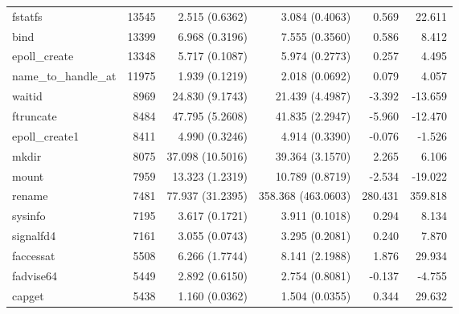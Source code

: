 \begin{longtable}{>{\ttfamily}lrrrrr}
                        fstatfs &      13545 &           2.515 (0.6362) &           3.084 (0.4063) &           0.569 &       22.611 \\
                           bind &      13399 &           6.968 (0.3196) &           7.555 (0.3560) &           0.586 &        8.412 \\
                  epoll\_create &      13348 &           5.717 (0.1087) &           5.974 (0.2773) &           0.257 &        4.495 \\
           name\_to\_handle\_at &      11975 &           1.939 (0.1219) &           2.018 (0.0692) &           0.079 &        4.057 \\
                         waitid &       8969 &          24.830 (9.1743) &          21.439 (4.4987) &          -3.392 &      -13.659 \\
                      ftruncate &       8484 &          47.795 (5.2608) &          41.835 (2.2947) &          -5.960 &      -12.470 \\
                 epoll\_create1 &       8411 &           4.990 (0.3246) &           4.914 (0.3390) &          -0.076 &       -1.526 \\
                          mkdir &       8075 &         37.098 (10.5016) &          39.364 (3.1570) &           2.265 &        6.106 \\
                          mount &       7959 &          13.323 (1.2319) &          10.789 (0.8719) &          -2.534 &      -19.022 \\
                         rename &       7481 &         77.937 (31.2395) &       358.368 (463.0603) &         280.431 &      359.818 \\
                        sysinfo &       7195 &           3.617 (0.1721) &           3.911 (0.1018) &           0.294 &        8.134 \\
                      signalfd4 &       7161 &           3.055 (0.0743) &           3.295 (0.2081) &           0.240 &        7.870 \\
                      faccessat &       5508 &           6.266 (1.7744) &           8.141 (2.1988) &           1.876 &       29.934 \\
                      fadvise64 &       5449 &           2.892 (0.6150) &           2.754 (0.8081) &          -0.137 &       -4.755 \\
                         capget &       5438 &           1.160 (0.0362) &           1.504 (0.0355) &           0.344 &       29.632 \\

\end{longtable}
